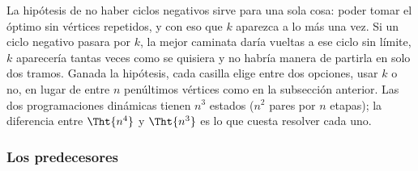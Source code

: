 \documentclass[11pt,letterpaper]{article}
\begin{document}
\begin{center}
\end{center}

\begin{idea}
  La hipótesis de no haber ciclos negativos sirve para una sola cosa:
  poder tomar el óptimo sin vértices repetidos, y con eso que $k$
  aparezca a lo más una vez. Si un ciclo negativo pasara por $k$, la
  mejor caminata daría vueltas a ese ciclo sin límite, $k$ aparecería
  tantas veces como se quisiera y no habría manera de partirla en solo
  dos tramos. Ganada la hipótesis, cada casilla elige entre dos
  opciones, usar $k$ o no, en lugar de entre $n$ penúltimos vértices
  como en la subsección anterior. Las dos programaciones dinámicas
  tienen $n^3$ estados ($n^2$ pares por $n$ etapas); la diferencia
  entre $\Tht{n^4}$ y $\Tht{n^3}$ es lo que cuesta resolver cada uno.
\end{idea}

\subsubsection*{Los predecesores}
\end{document}
